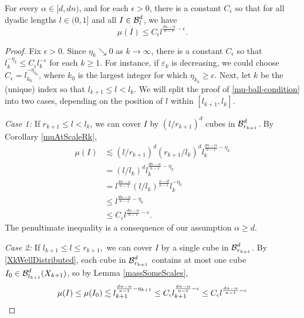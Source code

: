 \begin{lemma} \label{frostmanBound}
For every $\alpha \in [d, dn)$, and for each $\epsilon>0$, there is a constant $C_\epsilon$ so that for all dyadic lengths $l\in (0,1]$ and all $I \in \operatorname{\mathcal{B}}_l^d$, we have
	\begin{equation} 
	\mu(I) \leq C_{\epsilon} l^{\frac{dn - \alpha}{n - 1} - \epsilon}. \label{mu-ball-condition} 
	\end{equation} 
\end{lemma}
\begin{proof}
	Fix $\epsilon > 0$. Since $\eta_k \searrow 0$ as $k\to\infty$, there is a constant $C_{\epsilon}$ so that $l_k^{-\eta_k}\leq C_{\epsilon}l_k^{-\epsilon}$ for each $k \geq 1$. For instance, if $\varepsilon_k$ is decreasing, we could choose $C_{\epsilon}=l_{k_0}^{-\eta_{k_0}}$, where $k_0$ is the largest integer for which $\eta_{k_0} \geq \epsilon$. Next, let $k$ be the (unique) index so that $l_{k+1} \leq l < l_{k}$. We will split the proof of \eqref{mu-ball-condition} into two cases, depending on the position of  $l$ within $[l_{k+1}, l_k]$. 

	{\em{Case 1: }} If $r_{k+1} \leq l < l_k$, 
	we can cover $I$ by $(l/r_{k+1})^d$ cubes in $\operatorname{\mathcal{B}}^d_{r_{k+1}}$. By Corollary \ref{muAtScaleRk},
	\begin{equation}
	\begin{split}
	\mu(I) & \lesssim (l/r_{k+1})^d (r_{k+1}/l_k)^d l_k^{\frac{dn-\alpha}{n-1}-\eta_k} \\
	& = (l/l_k)^d l_k^{\frac{dn-\alpha}{n-1}-\eta_{k}}\\
	& = l^{\frac{dn-\alpha}{n-1}} (l/l_k)^{\frac{\alpha - d}{n-1}} l_k^{-\eta_k}\\
	& \leq l^{\frac{dn-\alpha}{n-1} - \eta_k}  \\
	& \leq C_{\epsilon}l^{\frac{dn-\alpha}{n-1}-\epsilon}.
	\end{split}
	\end{equation}
The penultimate inequality is a consequence of our assumption $\alpha \geq d$. 

	{\em{Case 2: }} If $l_{k+1} \leq l \leq r_{k+1},$ we can cover $I$ by a single cube in $\operatorname{\mathcal{B}}^d_{r_{k+1}}$. By \eqref{XkWellDistributed}, each cube in $\operatorname{\mathcal{B}}^d_{r_{k+1}}$ contains at most one cube $I_0 \in \operatorname{\mathcal{B}}^d_{l_{k+1}}(X_{k+1})$, so by Lemma \ref{massSomeScales},
	\[ 
		\mu(I) \leq \mu(I_0) \lesssim l_{k+1}^{\frac{dn - \alpha}{n - 1} - \eta_{k+1}} 
		\leq C_{\epsilon}l_{k+1}^{\frac{dn - \alpha}{n - 1} - \epsilon}
		\leq C_{\epsilon}l^{\frac{dn - \alpha}{n - 1} - \epsilon}\qedhere
	\]

\end{proof}

